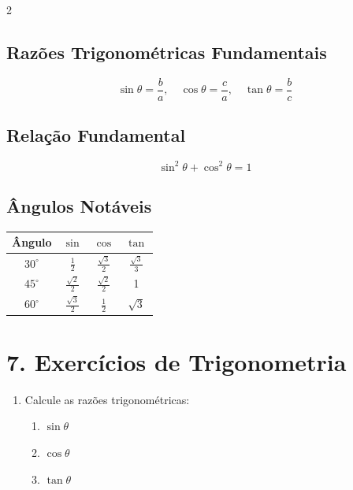 \documentclass[11pt]{article}
\begin{document}
\begin{multicols}{2}
\subsection*{Razões Trigonométricas Fundamentais}
\[
\sin\theta = \frac{b}{a}, \quad \cos\theta = \frac{c}{a}, \quad \tan\theta = \frac{b}{c}
\]

\subsection*{Relação Fundamental}
\[
\sin^2\theta + \cos^2\theta = 1
\]

\subsection*{Ângulos Notáveis}
\begin{center}
\begin{tabular}{|c|c|c|c|}
\hline
Ângulo & $\sin$ & $\cos$ & $\tan$ \\
\hline
$30^\circ$ & $\frac{1}{2}$ & $\frac{\sqrt{3}}{2}$ & $\frac{\sqrt{3}}{3}$ \\
\hline
$45^\circ$ & $\frac{\sqrt{2}}{2}$ & $\frac{\sqrt{2}}{2}$ & 1 \\
\hline
$60^\circ$ & $\frac{\sqrt{3}}{2}$ & $\frac{1}{2}$ & $\sqrt{3}$ \\
\hline
\end{tabular}
\end{center}

\section*{7. Exercícios de Trigonometria}

\begin{enumerate}
    \item Calcule as razões trigonométricas:
    \begin{center}
    \end{center}
    \begin{enumerate}[label=\alph*)]
        \item $\sin\theta$
        \item $\cos\theta$
        \item $\tan\theta$
    \end{enumerate}
    

\end{enumerate}
\end{multicols}
\end{document}
